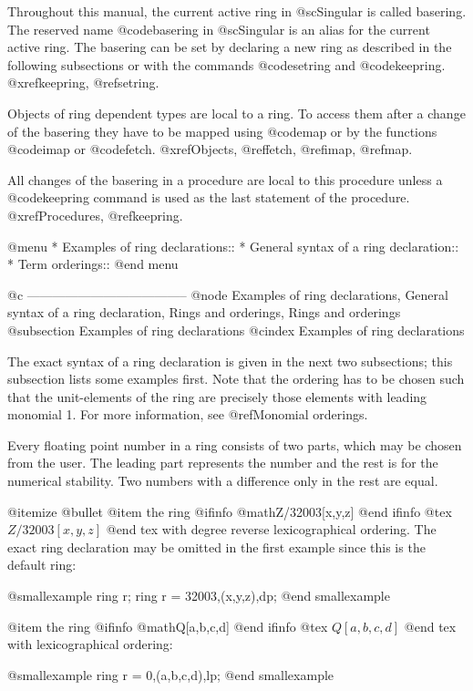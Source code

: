 Throughout this manual, the current active ring in @sc{Singular} is
called basering.  The reserved name @code{basering} in @sc{Singular} is
an alias for the current active ring.  The basering can be set by
declaring a new ring as described in the following subsections or with
the commands @code{setring} and @code{keepring}.  @xref{keepring},
@ref{setring}.

Objects of ring dependent types are local to a ring. To access them
after a change of the basering they have to be mapped using @code{map} or by
the functions @code{imap} or @code{fetch}.  @xref{Objects}, @ref{fetch},
@ref{imap}, @ref{map}.

All changes of the basering in a procedure are local to this procedure
unless a @code{keepring} command is used as the last statement of the
procedure.  @xref{Procedures}, @ref{keepring}.

@menu
* Examples of ring declarations::
* General syntax of a ring declaration::
* Term orderings::
@end menu

@c --------------------------------------
@node Examples of ring declarations, General syntax of a ring declaration, Rings and orderings, Rings and orderings
@subsection Examples of ring declarations
@cindex Examples of ring declarations

The exact syntax of a ring declaration is given in the next two
subsections; this subsection lists some examples first. Note that the
ordering has to be chosen such that the unit-elements of the
ring are precisely those elements with leading monomial 1.  For more
information, see @ref{Monomial orderings}.

Every floating point number in a ring consists of two parts, which may be
chosen from the user. The leading part represents the number and the rest
is for the numerical stability. Two numbers with a difference only in the
rest are equal.

@itemize @bullet
@item
the ring 
@ifinfo
@math{Z/32003[x,y,z]}
@end ifinfo
@tex
$Z/32003[x,y,z]$
@end tex
 with degree reverse lexicographical
ordering.  The exact ring declaration may be omitted in the first
example since this is the default ring:

@smallexample
ring r;
ring r = 32003,(x,y,z),dp;
@end smallexample

@item
the ring 
@ifinfo
@math{Q[a,b,c,d]}
@end ifinfo
@tex
$Q[a,b,c,d]$
@end tex
 with lexicographical ordering:

@smallexample
ring r = 0,(a,b,c,d),lp;
@end smallexample

